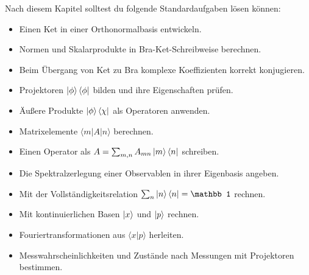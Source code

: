 Nach diesem Kapitel solltest du folgende Standardaufgaben lösen können:
\begin{itemize}
    \item Einen Ket in einer Orthonormalbasis entwickeln.
    \item Normen und Skalarprodukte in Bra-Ket-Schreibweise berechnen.
    \item Beim Übergang von Ket zu Bra komplexe Koeffizienten korrekt konjugieren.
    \item Projektoren $\left|\phi\right\rangle\left\langle\phi\right|$ bilden und ihre Eigenschaften prüfen.
    \item Äußere Produkte $\left|\phi\right\rangle\left\langle\chi\right|$ als Operatoren anwenden.
    \item Matrixelemente $\langle m|A|n\rangle$ berechnen.
    \item Einen Operator als $A=\sum_{m,n}A_{mn}\left|m\right\rangle\left\langle n\right|$ schreiben.
    \item Die Spektralzerlegung einer Observablen in ihrer Eigenbasis angeben.
    \item Mit der Vollständigkeitsrelation $\sum_n\ket n\bra n=\mathbb 1$ rechnen.
    \item Mit kontinuierlichen Basen $\left|x\right\rangle$ und $\left|p\right\rangle$ rechnen.
    \item Fouriertransformationen aus $\langle x|p\rangle$ herleiten.
    \item Messwahrscheinlichkeiten und Zustände nach Messungen mit Projektoren bestimmen.
\end{itemize}
